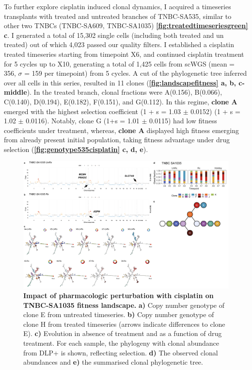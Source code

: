  
To further explore cisplatin induced clonal dynamics, I acquired a timeseries transplants with treated and untreated branches of TNBC-SA535, similar to other two TNBCs (TNBC-SA609, TNBC-SA1035) \textbf{\autoref{fig:treatedtimeseriesgreen} c}.
I generated a total of 15,302 single cells (including both treated and un treated) out of which 4,023 passed our quality filters.
I established a cisplatin treated timeseries starting from timepoint X6, and continued cisplatin treatment for 5 cycles up to X10, generating a total of 1,425 cells from scWGS (mean = 356, $\sigma$ = 159 per timepoint) from 5 cycles. A cut of the phylogenetic tree inferred over all cells in this series, resulted in 11 clones (\textbf{\autoref{fig:landscapefitness} a, b, c-middle}). 
In the treated branch, clonal fractions were A(0.156), B(0.066), C(0.140), D(0.194), E(0.182), F(0.151), and G(0.112). In this regime, \textbf{clone A} emerged with the highest selection coefficient (1 + s = 1.03 $\pm$  0.0152) (1 + s = 1.02 $\pm$ 0.0116). Notably, clone G (1+s = 1.01 $\pm$ 0.0115) had low fitness coefficients under treatment, whereas, \textbf{clone A} displayed high fitness emerging from already present initial population, taking fitness advantage under drug selection (\textbf{\autoref{fig:genotype535cisplatin} c, d, e}).


\begin{figure}
\centering
\includegraphics[width=\textwidth]{Figures/chap4/genePlot1035.png}
\caption[Impact of pharmacologic perturbation with cisplatin on TNBC-SA1035 fitness landscape.]
	{\small
	\textbf{Impact of pharmacologic perturbation with cisplatin on TNBC-SA1035 fitness landscape.}
	    \textbf{a)} Copy number genotype of clone E from untreated timeseries. \textbf{b)} Copy number genotype of clone H from treated timeseries (arrows indicate differences to clone E). \textbf{c)}  Evolution in absence of treatment and as a function of drug treatment. For each sample, the phylogeny with clonal abundance from DLP+ is shown, reflecting selection. \textbf{d)} The observed clonal abundances and \textbf{e)} the summarised clonal phylogenetic tree.}
\label{fig:genotype1035}
\end{figure}

